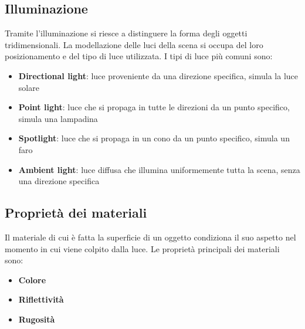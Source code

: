 \documentclass[a4paper]{article}
\begin{document}
\subsection{Illuminazione}
Tramite l'illuminazione si riesce a distinguere la forma degli oggetti tridimensionali.
La modellazione delle luci della scena si occupa del loro posizionamento e del tipo di luce
utilizzata. I tipi di luce più comuni sono:
\begin{itemize}
  \item \textbf{Directional light}: luce proveniente da una direzione specifica, simula
    la luce solare
  \item \textbf{Point light}: luce che si propaga in tutte le direzioni da un punto
    specifico, simula una lampadina
  \item \textbf{Spotlight}: luce che si propaga in un cono da un punto specifico,
    simula un faro
  \item \textbf{Ambient light}: luce diffusa che illumina uniformemente tutta la scena,
    senza una direzione specifica
\end{itemize}

\subsection{Proprietà dei materiali}
Il materiale di cui è fatta la superficie di un oggetto condiziona il suo aspetto nel
momento in cui viene colpito dalla luce. Le proprietà principali dei materiali sono:
\begin{itemize}
  \item \textbf{Colore}
  \item \textbf{Riflettività}
  \item \textbf{Rugosità}
\end{itemize}
\end{document}
